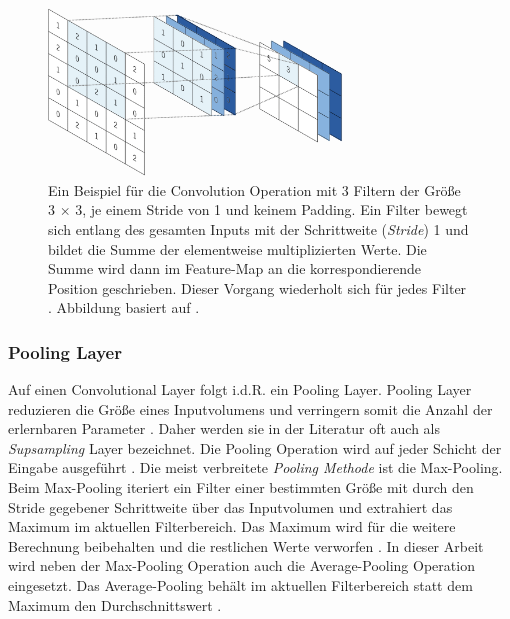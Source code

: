 \begin{figure}
	\centering
	\includegraphics[width=0.7\textwidth]{images/ann_conv/convolution_layer.png}
	\caption{Ein Beispiel für die Convolution Operation mit 3 Filtern der Größe 3 $\times$ 3, je einem Stride von 1 und keinem Padding. Ein Filter bewegt sich entlang des gesamten Inputs mit der Schrittweite (\textit{Stride}) 1 und bildet die Summe der elementweise multiplizierten Werte. Die Summe wird dann im Feature-Map an die korrespondierende Position geschrieben. Dieser Vorgang wiederholt sich für jedes Filter \cite{yamashitaConvolutionalNeuralNetworks2018}. Abbildung basiert auf \cite{yamashitaConvolutionalNeuralNetworks2018}.}
	\label{fig:convolution_layer}
\end{figure}

\subsubsection{Pooling Layer}
Auf einen Convolutional Layer folgt i.d.R. ein Pooling Layer. Pooling Layer reduzieren die Größe eines Inputvolumens und verringern somit die Anzahl der erlernbaren Parameter \cite{johnsonCS231nConvolutionalNeurala}. Daher werden sie in der Literatur oft auch als \textit{Supsampling} Layer bezeichnet. Die Pooling Operation wird auf jeder Schicht der Eingabe ausgeführt \cite{johnsonCS231nConvolutionalNeurala}. Die meist verbreitete \textit{Pooling Methode} ist die Max-Pooling. Beim Max-Pooling iteriert ein Filter einer bestimmten Größe mit durch den Stride gegebener Schrittweite über das Inputvolumen und extrahiert das Maximum im aktuellen Filterbereich. Das Maximum wird für die weitere Berechnung beibehalten und die restlichen Werte verworfen
 \cite{johnsonCS231nConvolutionalNeurala}. In dieser Arbeit wird neben der Max-Pooling Operation auch die Average-Pooling Operation eingesetzt. Das Average-Pooling behält im aktuellen Filterbereich statt dem Maximum den Durchschnittswert \cite{johnsonCS231nConvolutionalNeurala}.
 
